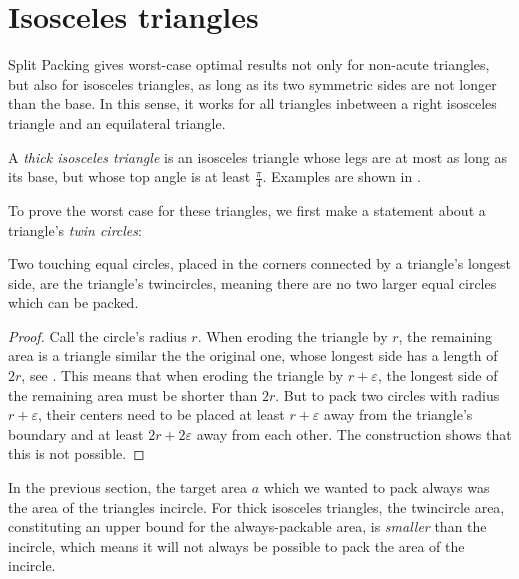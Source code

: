 \documentclass[a4paper,style=print,oneside,bibliography=totoc,nexus,lnum,extramargin]{tubsbook}
\begin{document}

\section{Isosceles triangles}

Split Packing gives worst-case optimal results not only for non-acute triangles, but also for isosceles triangles, as long as its two symmetric sides are not longer than the base. In this sense, it works for all triangles inbetween a right isosceles triangle and an equilateral triangle.

\begin{definition}
    A \emph{thick isosceles triangle} is an isosceles triangle whose legs are at most as long as its base, but whose top angle is at least $\frac{\pi}{4}$. Examples are shown in .
\end{definition}


To prove the worst case for these triangles, we first make a statement about a triangle's \emph{twin circles}:

\begin{lemma}\label{th:iso-worst}
    Two touching equal circles, placed in the corners connected by a triangle's longest side, are the triangle's twincircles, meaning there are no two larger equal circles which can be packed.
\end{lemma}

\begin{proof}
    Call the circle's radius $r$.
    When eroding the triangle by $r$, the remaining area is a triangle similar the the original one, whose longest side has a length of $2r$, see . This means that when eroding the triangle by $r+\varepsilon$, the longest side of the remaining area must be shorter than $2r$.
    But to pack two circles with radius $r+\varepsilon$, their centers need to be placed at least $r+\varepsilon$ away from the triangle's boundary and at least $2r+2\varepsilon$ away from each other. The construction shows that this is not possible.
\end{proof}


In the previous section, the target area $a$ which we wanted to pack always was the area of the triangles incircle. For thick isosceles triangles, the twincircle area, constituting an upper bound for the always-packable area, is \emph{smaller} than the incircle, which means it will not always be possible to pack the area of the incircle.
\end{document}
